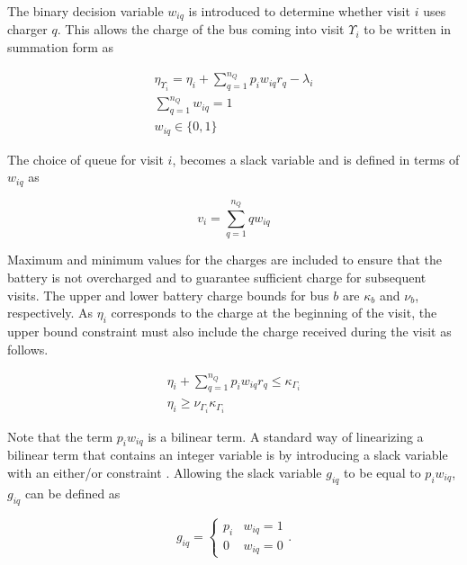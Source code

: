 \documentclass[utf8]{FrontiersinHarvard}
\let\cite\citep                                                                 %
\begin{document}
The binary decision variable $w_{iq}$ is introduced to determine whether visit $i$ uses charger $q$. This allows the
charge of the bus coming into visit $\Upsilon_i$ to be written in summation form as

\begin{subequations}
    \label{subeq:pre_next_charge}
\begin{align}
    \eta_{\Upsilon_i} = \eta_i + \sum_{q=1}^{n_Q} p_i w_{iq} r_q - \lambda_i  \\
    \sum_{q=1}^{n_Q} w_{iq} = 1 \\
    w_{iq} \in \{0,1\}
\end{align}
\end{subequations}

The choice of queue for visit $i$, becomes a slack variable and is defined in terms of $w_{iq}$ as

\begin{equation}
    v_i = \sum_{q=1}^{n_Q} qw_{iq}
\end{equation}

Maximum and minimum values for the charges are included to ensure that the battery is not overcharged and to guarantee
sufficient charge for subsequent visits. The upper and lower battery charge bounds for bus $b$ are $\kappa_b$ and $\nu_b$,
respectively. As $\eta_i$ corresponds to the charge at the beginning of the visit, the upper bound constraint must also
include the charge received during the visit as follows.

\begin{subequations}
    \label{subeq:pre_min_max}
\begin{align}
    \eta_i + \sum_{q=1}^{n_Q} p_i w_{iq} r_q \leq \kappa_{\Gamma_i}                 \\
    \eta_i \geq \nu_{\Gamma_i} \kappa_{\Gamma_i}
\end{align}
\end{subequations}

Note that the term $p_i w_{iq}$ is a bilinear term. A standard way of linearizing a bilinear term that contains an integer variable is by introducing
a slack variable with an either/or constraint \cite{Chen2010,Rodriguez2013}. Allowing the slack variable $g_{iq}$ to be
equal to $p_i w_{iq}$, $g_{iq}$ can be defined as

\begin{equation}
    \label{eq:giq_cases}
    g_{iq} =
    \begin{cases}
        p_i & w_{iq} = 1 \\
        0 & w_{iq} = 0
    \end{cases}.
\end{equation}
\end{document}
